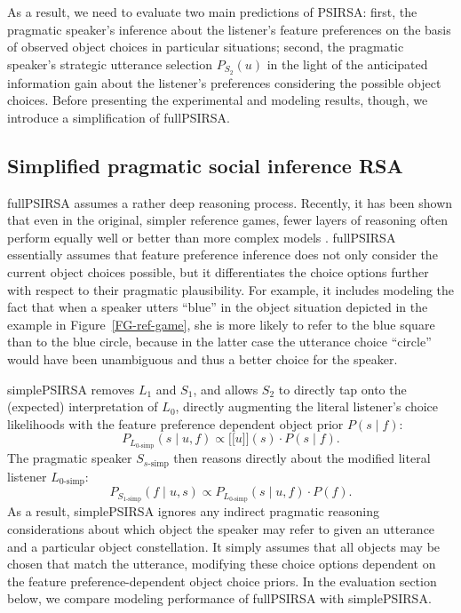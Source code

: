 \documentclass[10pt,a4paper]{article}
\newcommand{\sem}[1]{\mbox{$[\![$#1$]\!]$}}
\begin{document}
As a result, we need to evaluate two main predictions of PSIRSA:  
first, the pragmatic speaker's inference about the listener's feature preferences on the basis of observed object choices in particular situations; 
second, the pragmatic speaker's strategic utterance selection $P_{S_2}(u)$ in the light of the anticipated information gain about the listener's preferences considering the possible object choices.
Before presenting the experimental and modeling results, though, we introduce a simplification of fullPSIRSA. 


\subsection{Simplified pragmatic social inference RSA}

fullPSIRSA assumes a rather deep reasoning process. 
Recently, it has been shown that even in the original, simpler reference games, fewer layers of reasoning often perform equally well or better than more complex models .
fullPSIRSA essentially assumes that feature preference inference does not only consider the current object choices possible, but it differentiates the choice options further with respect to their pragmatic plausibility. 
For example, it includes modeling the fact that when a speaker utters ``blue'' in the object situation depicted in the example in Figure~\ref{FG-ref-game}, she is more likely to refer to the blue square than to the blue circle, because in the latter case the utterance choice ``circle'' would have been unambiguous and thus a better choice for the speaker.


simplePSIRSA removes $L_1$ and $S_1$, and allows $S_2$ to directly tap onto the (expected) interpretation of $L_0$, directly augmenting the literal listener's choice likelihoods with the feature preference dependent object prior $P(s\mid f)$:
$$P_{L_{0\textrm{-simp}}}(s\mid u,f) \propto \sem{$u$}(s) \cdot P(s\mid f).$$
The pragmatic speaker $S_{s\textrm{-simp}}$ then reasons directly about the modified literal listener $L_{0\textrm{-simp}}$: 
$$P_{S_{1\textrm{-simp}}}(f\mid u,s) \propto P_{L_{0\textrm{-simp}}}(s\mid u,f) \cdot P(f).$$
As a result, simplePSIRSA ignores any indirect pragmatic reasoning considerations about which object the speaker may refer to given an utterance and a particular object constellation.
It simply assumes that all objects may be chosen that match the utterance, modifying these choice options dependent on the feature preference-dependent object choice priors.
In the evaluation section below, we compare modeling performance of fullPSIRSA with simplePSIRSA. 
\end{document}
